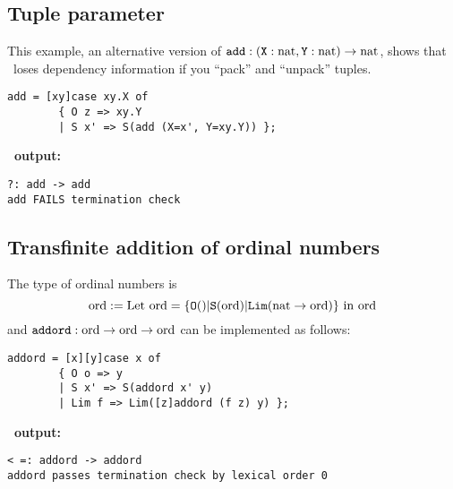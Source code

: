 
\subsection{Tuple parameter\label{ex:tupelparm}}
This example, an alternative version of $\mathtt{add} :
\mathtt{(X} : \mathrm{nat} \mathtt{, Y} : \mathrm{nat} \mathtt{)} \rightarrow \mathrm{nat}$, shows that \foetus\
loses dependency information if you ``pack'' and ``unpack'' tuples.
\begin{verbatim}
add = [xy]case xy.X of
        { O z => xy.Y
        | S x' => S(add (X=x', Y=xy.Y)) };
\end{verbatim}
{\bf \foetus\ output:}\nopagebreak
\begin{verbatim}
?: add -> add
add FAILS termination check
\end{verbatim}

\subsection{Transfinite addition of ordinal numbers\label{ex:addord}}
The type of ordinal numbers is
$$
   \mathrm{ord} := \mathrm{Let}\ \mathrm{ord} = \{ \mathtt{O()} | \mathtt{S(} \mathrm{ord} \mathtt{)} |
        \mathtt{Lim(} \mathrm{nat} \rightarrow \mathrm{ord} \mathtt{)} \} \ \mathrm{in}\ \mathrm{ord}
$$
and $\mathtt{addord} : \mathrm{ord} \rightarrow \mathrm{ord} \rightarrow \mathrm{ord}$ can be
implemented as follows:
\begin{verbatim}
addord = [x][y]case x of
        { O o => y
        | S x' => S(addord x' y)
        | Lim f => Lim([z]addord (f z) y) };
\end{verbatim}
{\bf \foetus\ output:}\nopagebreak
\begin{verbatim}
< =: addord -> addord
addord passes termination check by lexical order 0
\end{verbatim}


